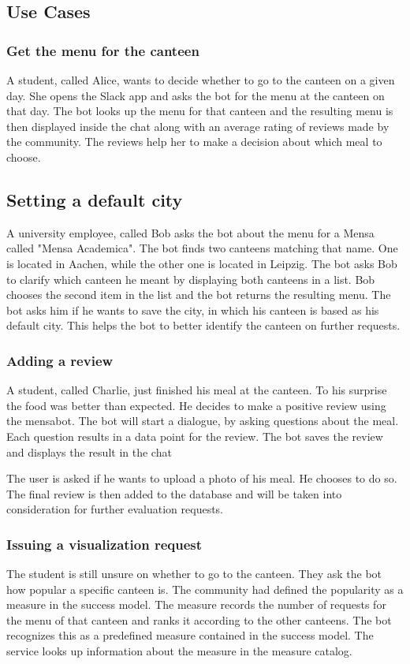 \subsection{Use Cases}

\subsubsection{Get the menu for the canteen} A student, called Alice, wants to decide whether to go to the canteen on a given day. She opens the Slack app and asks the bot for the menu at the canteen on that day. The bot looks up the menu for that canteen and the resulting menu is then displayed inside the chat along with an average rating of reviews made by the community. The reviews help her to make a decision about which meal to choose.

\subsection{Setting a default city}
A university employee, called Bob asks the bot about the menu for a Mensa called "Mensa Academica". The bot finds two canteens matching that name. One is located in Aachen, while the other one is located in Leipzig. 
The bot asks Bob to clarify which canteen he meant by displaying both canteens in a list. Bob chooses the second item in the list and the bot returns the resulting menu.
The bot asks him if he wants to save the city, in which his canteen is based as his default city. This helps the bot to better identify the canteen on further requests.

\subsubsection{Adding a review} A student, called Charlie, just finished his meal at the canteen. To his surprise the food was better than expected. He decides to make a positive review using the mensabot. 
The bot will start a dialogue, by asking questions about the meal. Each question results in a data point for the review. The bot saves the review and displays the result in the chat

The user is asked if he wants to upload a photo of his meal. He chooses to do so. The final review is then added to the database and will be taken into consideration for further evaluation requests.


\subsubsection{Issuing a visualization request}
The student is still unsure on whether to go to the canteen. 
They ask the bot how popular a specific canteen is. 
The community had defined the popularity as a measure in the success model. The measure records the number of requests for the menu of that canteen and ranks it according to the other canteens.
The bot recognizes this as a predefined measure contained in the success model.
The service looks up information about the measure in the measure catalog. 

